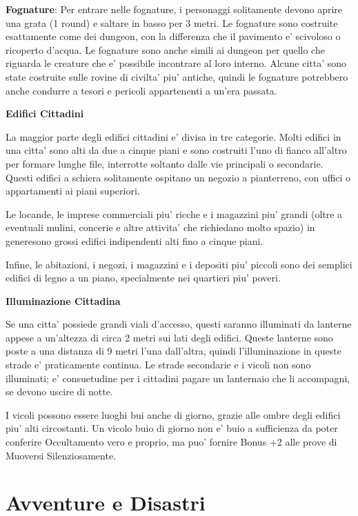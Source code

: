 \documentclass[a4paper,11pt,twoside,openany]{dndbook}
\begin{document}
\textbf{Fognature}: Per entrare nelle fognature, i personaggi solitamente devono aprire una grata (1 round) e saltare in basso per 3 metri. Le fognature sono costruite esattamente come dei dungeon, con la differenza che il pavimento e' scivoloso o ricoperto d'acqua. Le fognature sono anche simili ai dungeon per quello che riguarda le creature che e' possibile incontrare al loro interno. Alcune citta' sono state costruite sulle rovine di civilta' piu' antiche, quindi le fognature potrebbero anche condurre a tesori e pericoli appartenenti a un'era passata.

\textbf{Edifici Cittadini}

La maggior parte degli edifici cittadini e' divisa in tre categorie. Molti edifici in una citta' sono alti da due a cinque piani e sono costruiti l'uno di fianco all'altro per formare lunghe file, interrotte soltanto dalle vie principali o secondarie. Questi edifici a schiera solitamente ospitano un negozio a pianterreno, con uffici o appartamenti ai piani superiori.

Le locande, le imprese commerciali piu' ricche e i magazzini piu' grandi (oltre a eventuali mulini, concerie e altre attivita' che richiedano molto spazio) in generesono grossi edifici indipendenti alti fino a cinque piani.

Infine, le abitazioni, i negozi, i magazzini e i depositi piu' piccoli sono dei semplici edifici di legno a un piano, specialmente nei quartieri piu' poveri.

\textbf{Illuminazione Cittadina}

Se una citta' possiede grandi viali d'accesso, questi saranno illuminati da lanterne appese a un'altezza di circa 2 metri sui lati degli edifici. Queste lanterne sono poste a una distanza di 9 metri l'una dall'altra, quindi l'illuminazione in queste strade e' praticamente continua. Le strade secondarie e i vicoli non sono illuminati; e' consuetudine per i cittadini pagare un lanternaio che li accompagni, se devono uscire di notte.

I vicoli possono essere luoghi bui anche di giorno, grazie alle ombre degli edifici piu' alti circostanti. Un vicolo buio di giorno non e' buio a sufficienza da poter conferire Occultamento vero e proprio, ma puo' fornire Bonus +2 alle prove di Muoversi Silenziosamente.

\pagebreak

\section{Avventure e Disastri}
\end{document}
